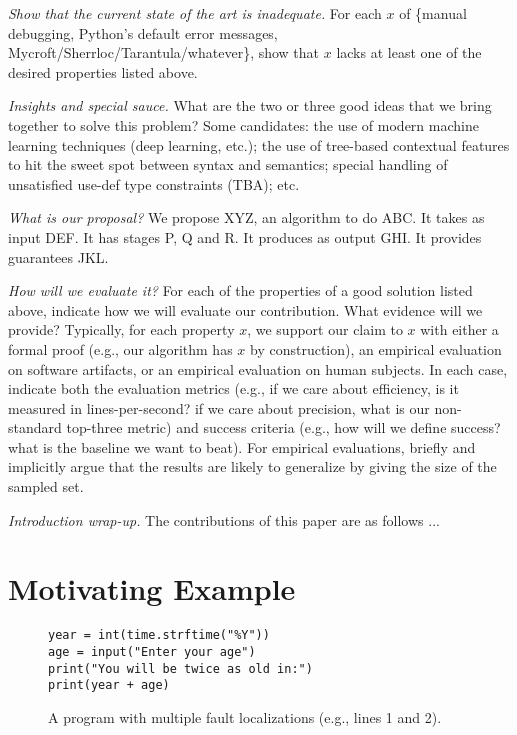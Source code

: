 \documentclass[conference]{IEEEtran}
\begin{document}
\emph{Show that the current state of the art is inadequate.} For each $x$ of
\{manual debugging, Python's default error messages,
Mycroft/Sherrloc/Tarantula/whatever\}, show that $x$ lacks at least one of the
desired properties listed above.

\emph{Insights and special sauce.} What are the two or three good ideas
that we bring together to solve this problem? Some candidates: the use of
modern machine learning techniques (deep learning, etc.); the use of
tree-based contextual features to hit the sweet spot between syntax and semantics;
special handling of unsatisfied use-def type constraints (TBA); etc.

\emph{What is our proposal?} We propose XYZ, an algorithm to do ABC. It
takes as input DEF. It has stages P, Q and R. It produces as output GHI. It
provides guarantees JKL.

\emph{How will we evaluate it?} For each of the properties of a good
solution listed above, indicate how we will evaluate our contribution. What
evidence will we provide? Typically, for each property $x$, we support our
claim to $x$ with either a formal proof (e.g., our algorithm has $x$ by
construction), an empirical evaluation on software artifacts, or an
empirical evaluation on human subjects. In each case, indicate both the
evaluation metrics (e.g., if we care about efficiency, is it measured in
lines-per-second? if we care about precision, what is our non-standard
top-three metric) and success criteria (e.g., how will we define success?
what is the baseline we want to beat). For empirical evaluations, briefly
and implicitly argue that the results are likely to generalize by giving
the size of the sampled set.

\emph{Introduction wrap-up.} The contributions of this paper are as follows
...

\section{Motivating Example}

\begin{figure}
\begin{lstlisting}
year = int(time.strftime("%Y"))
age = input("Enter your age")
print("You will be twice as old in:")
print(year + age)
\end{lstlisting}
\caption{
\label{fig-motex} 
A program with multiple fault localizations (e.g.,
lines 1 and 2).} 
\end{figure}
\end{document}
